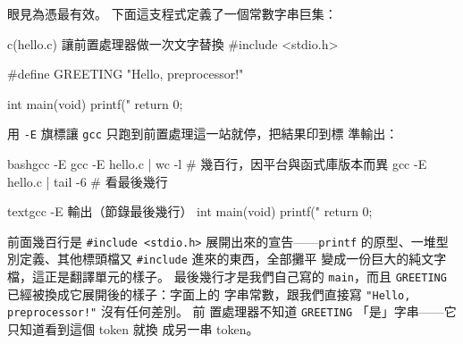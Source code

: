 \begin{center}
\label{fig:pp-pipeline}
\end{center}

眼見為憑最有效。 下面這支程式定義了一個常數字串巨集：

\begin{example}{c}{(hello.c) 讓前置處理器做一次文字替換}
#include <stdio.h>

#define GREETING "Hello, preprocessor!"

int main(void) {
    printf("%
    return 0;
}
\end{example}

用 \texttt{-E} 旗標讓 \texttt{gcc} 只跑到前置處理這一站就停，把結果印到標
準輸出：

\begin{code}{bash}{gcc -E}
gcc -E hello.c | wc -l      # 幾百行，因平台與函式庫版本而異
gcc -E hello.c | tail -6    # 看最後幾行
\end{code}

\begin{code}{text}{gcc -E 輸出（節錄最後幾行）}
int main(void) {
    printf("%
    return 0;
}
\end{code}

前面幾百行是 \texttt{\#include <stdio.h>} 展開出來的宣告——\texttt{printf}
的原型、一堆型別定義、其他標頭檔又 \texttt{\#include} 進來的東西，全部攤平
變成一份巨大的純文字檔，這正是翻譯單元的樣子。 最後幾行才是我們自己寫的
\texttt{main}，而且 \texttt{GREETING} 已經被換成它展開後的樣子：字面上的
字串常數，跟我們直接寫 \texttt{"Hello, preprocessor!"} 沒有任何差別。 前
置處理器不知道 \texttt{GREETING} 「是」字串——它只知道看到這個 token 就換
成另一串 token。


